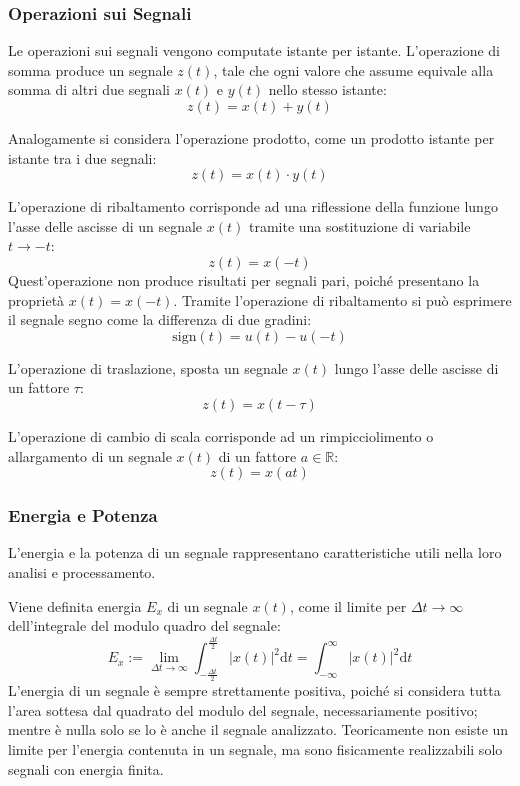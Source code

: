 \documentclass{article}
\newcommand{\df}{\mathrm{d}}
\numberwithin{equation}{subsection}
\begin{document}
\subsubsection{Operazioni sui Segnali}

Le operazioni sui segnali vengono computate istante per istante. L'operazione di somma produce un segnale $z(t)$, tale che ogni valore che assume equivale alla somma 
di altri due segnali $x(t)$ e $y(t)$ nello stesso istante:
\begin{equation*}
    z(t)=x(t)+y(t)
\end{equation*}

Analogamente si considera l'operazione prodotto, come un prodotto istante per istante tra i due segnali:
\begin{equation*}
    z(t)=x(t)\cdot y(t)
\end{equation*}

L'operazione di ribaltamento corrisponde ad una riflessione della funzione lungo l'asse delle ascisse di un segnale $x(t)$ tramite una sostituzione di variabile $t\to-t$:
\begin{equation*}
    z(t)=x(-t)
\end{equation*}
Quest'operazione non produce risultati per segnali pari, poiché presentano la proprietà $x(t)=x(-t)$. 
Tramite l'operazione di ribaltamento si può esprimere il segnale segno come la differenza di due gradini:
\begin{equation*}
    \mbox{sign}(t)=u(t)-u(-t)
\end{equation*}


L'operazione di traslazione, sposta un segnale $x(t)$ lungo l'asse delle ascisse di un fattore $\tau$:
\begin{equation*}
    z(t)=x(t-\tau)
\end{equation*}

L'operazione di cambio di scala corrisponde ad un rimpicciolimento o allargamento di un segnale $x(t)$ di un fattore $a\in\mathbb{R}$:
\begin{equation*}
    z(t)=x(at)
\end{equation*}

\subsubsection{Energia e Potenza}

L'energia e la potenza di un segnale rappresentano caratteristiche utili nella loro analisi e processamento. 

Viene definita energia $E_x$ di un segnale $x(t)$, come il limite per $\Delta t\to\infty$ dell'integrale del modulo quadro del segnale: 
\begin{equation}
    E_x:=\lim_{\Delta t\to\infty}\displaystyle\int_{-\frac{\Delta t}{2}}^{\frac{\Delta t}{2}}|x(t)|^2\df t=\int_{-\infty}^{\infty}|x(t)|^2\df t
\end{equation}
L'energia di un segnale è sempre strettamente positiva, poiché si considera tutta l'area sottesa dal quadrato del modulo del segnale, necessariamente positivo; mentre è nulla 
solo se lo è anche il segnale analizzato. Teoricamente non esiste un limite per l'energia contenuta in un segnale, ma sono fisicamente realizzabili solo segnali con energia 
finita. 
\end{document}
